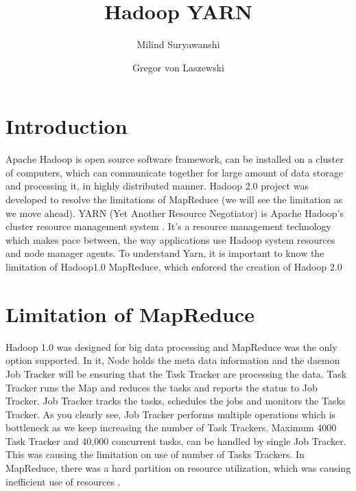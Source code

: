 \documentclass[9pt,twocolumn,twoside]{../../styles/osajnl}
\title{Hadoop YARN}
\author[1,2]{Milind Suryawanshi}
\author[1,*]{Gregor von Laszewski}
\affil[1]{School of Informatics and Computing, Bloomington, IN 47408, U.S.A.}
\affil[2]{Savitribai Phule Pune University 2010, Pune, Maharashtra 411007 India }
\affil[*]{Corresponding authors: laszewski@gmail.com}
\begin{document}
\maketitle
{}
\section{Introduction}

Apache Hadoop \CE is open source software framework, can be installed on a cluster of computers, which can communicate together for large amount of data storage and processing it, in highly distributed manner. Hadoop 2.0 project was developed to resolve the limitations of MapReduce (we will see the limitation as we move ahead). YARN (Yet Another Resource Negotiator) is Apache Hadoop’s cluster resource management system \cite{www-1}. It’s a resource management technology which makes pace between, the way applications use Hadoop system resources and node manager agents.  To understand Yarn, it is important to know the limitation of Hadoop1.0 MapReduce, which enforced the creation of Hadoop 2.0 


\section{Limitation of MapReduce}

Hadoop 1.0 was designed for big data processing and MapReduce was the only option supported. In it, Node holds the meta data information and the daemon Job Tracker will be ensuring that the Task Tracker are processing the data. Task Tracker runs the Map
and reduces the tasks and reports the status to Job Tracker. Job Tracker tracks the tasks, schedules the jobs and monitors the Tasks Tracker. As you clearly see,
Job Tracker performs multiple operations which is bottleneck as we keep increasing the number of Task Trackers. Maximum 4000 Task Tracker and 40,000 concurrent tasks, can be handled by single Job Tracker. This was causing the limitation on use of number of Tasks Trackers. In MapReduce, there was a hard partition on resource utilization, which was causing inefficient use of resources \cite{www-5}.
\end{document}
